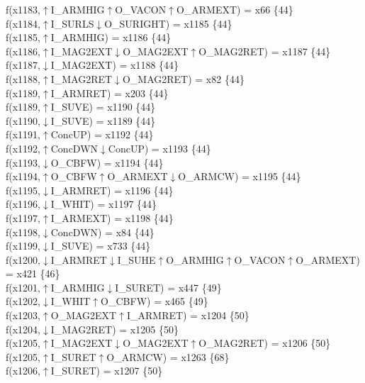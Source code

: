 f(x1183,$\uparrow$I\_ARMHIG$\uparrow$O\_VACON$\uparrow$O\_ARMEXT) = x66 \{44\} \\  
f(x1184,$\uparrow$I\_SURLS$\downarrow$O\_SURIGHT) = x1185 \{44\} \\  
f(x1185,$\uparrow$I\_ARMHIG) = x1186 \{44\} \\  
f(x1186,$\uparrow$I\_MAG2EXT$\downarrow$O\_MAG2EXT$\uparrow$O\_MAG2RET) = x1187 \{44\} \\  
f(x1187,$\downarrow$I\_MAG2EXT) = x1188 \{44\} \\  
f(x1188,$\uparrow$I\_MAG2RET$\downarrow$O\_MAG2RET) = x82 \{44\} \\  
f(x1189,$\uparrow$I\_ARMRET) = x203 \{44\} \\  
f(x1189,$\uparrow$I\_SUVE) = x1190 \{44\} \\  
f(x1190,$\downarrow$I\_SUVE) = x1189 \{44\} \\  
f(x1191,$\uparrow$ConcUP) = x1192 \{44\} \\  
f(x1192,$\uparrow$ConcDWN$\downarrow$ConcUP) = x1193 \{44\} \\  
f(x1193,$\downarrow$O\_CBFW) = x1194 \{44\} \\  
f(x1194,$\uparrow$O\_CBFW$\uparrow$O\_ARMEXT$\downarrow$O\_ARMCW) = x1195 \{44\} \\  
f(x1195,$\downarrow$I\_ARMRET) = x1196 \{44\} \\  
f(x1196,$\downarrow$I\_WHIT) = x1197 \{44\} \\  
f(x1197,$\uparrow$I\_ARMEXT) = x1198 \{44\} \\  
f(x1198,$\downarrow$ConcDWN) = x84 \{44\} \\  
f(x1199,$\downarrow$I\_SUVE) = x733 \{44\} \\  
f(x1200,$\downarrow$I\_ARMRET$\downarrow$I\_SUHE$\uparrow$O\_ARMHIG$\uparrow$O\_VACON$\uparrow$O\_ARMEXT) = x421 \{46\} \\  
f(x1201,$\uparrow$I\_ARMHIG$\downarrow$I\_SURET) = x447 \{49\} \\  
f(x1202,$\downarrow$I\_WHIT$\uparrow$O\_CBFW) = x465 \{49\} \\  
f(x1203,$\uparrow$O\_MAG2EXT$\uparrow$I\_ARMRET) = x1204 \{50\} \\  
f(x1204,$\downarrow$I\_MAG2RET) = x1205 \{50\} \\  
f(x1205,$\uparrow$I\_MAG2EXT$\downarrow$O\_MAG2EXT$\uparrow$O\_MAG2RET) = x1206 \{50\} \\  
f(x1205,$\uparrow$I\_SURET$\uparrow$O\_ARMCW) = x1263 \{68\} \\  
f(x1206,$\uparrow$I\_SURET) = x1207 \{50\} \\  
